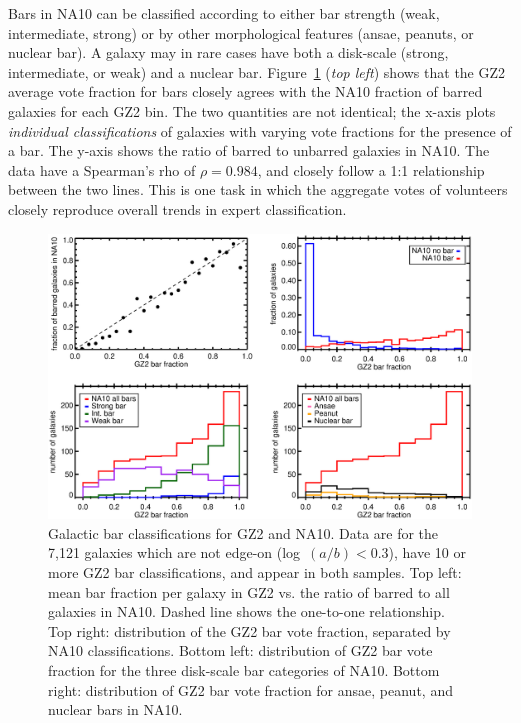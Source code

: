 \documentclass[useAMS,usenatbib]{mn2e}
\begin{document}
Bars in NA10 can be classified according to either bar strength (weak, intermediate, strong) or by other morphological features (ansae, peanuts, or nuclear bar). A galaxy may in rare cases have both a disk-scale (strong, intermediate, or weak) and a nuclear bar. Figure~\ref{fig-na_bars} ({\it top left}) shows that the GZ2 average vote fraction for bars closely agrees with the NA10 fraction of barred galaxies for each GZ2 bin. The two quantities are not identical; the x-axis plots {\it individual classifications} of galaxies with varying vote fractions for the presence of a bar. The y-axis shows the ratio of barred to unbarred galaxies in NA10. The data have a Spearman's rho of $\rho=0.984$, and closely follow a 1:1 relationship between the two lines. This is one task in which the aggregate votes of volunteers closely reproduce overall trends in expert classification. 

\begin{figure}
\includegraphics[angle=0,width=7.0in]{figures/na_bars_axial_10.eps}
\caption{Galactic bar classifications for GZ2 and NA10. Data are for the 7,121 galaxies which are not edge-on (log~$(a/b)<0.3$), have 10 or more GZ2 bar classifications, and appear in both samples. Top left: mean bar fraction per galaxy in GZ2 vs. the ratio of barred to all galaxies in NA10. Dashed line shows the one-to-one relationship. Top right: distribution of the GZ2 bar vote fraction, separated by NA10 classifications. Bottom left: distribution of GZ2 bar vote fraction for the three disk-scale bar categories of NA10. Bottom right: distribution of GZ2 bar vote fraction for ansae, peanut, and nuclear bars in NA10. 
\label{fig-na_bars}}
\end{figure}
\end{document}
